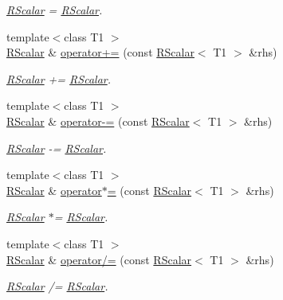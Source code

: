 \begin{DoxyCompactItemize}
\begin{DoxyCompactList}\small\item\em \mbox{\hyperlink{classENSEM_1_1RScalar}{R\+Scalar}} = \mbox{\hyperlink{classENSEM_1_1RScalar}{R\+Scalar}}. \end{DoxyCompactList}\item 
{\footnotesize template$<$class T1 $>$ }\\\mbox{\hyperlink{classENSEM_1_1RScalar}{R\+Scalar}} \& \mbox{\hyperlink{classENSEM_1_1RScalar_adc6bf2610b8af0ab175ef00d9194aa1d}{operator+=}} (const \mbox{\hyperlink{classENSEM_1_1RScalar}{R\+Scalar}}$<$ T1 $>$ \&rhs)
\begin{DoxyCompactList}\small\item\em \mbox{\hyperlink{classENSEM_1_1RScalar}{R\+Scalar}} += \mbox{\hyperlink{classENSEM_1_1RScalar}{R\+Scalar}}. \end{DoxyCompactList}\item 
{\footnotesize template$<$class T1 $>$ }\\\mbox{\hyperlink{classENSEM_1_1RScalar}{R\+Scalar}} \& \mbox{\hyperlink{classENSEM_1_1RScalar_a6d158db5ecf3dcc81fe905c6664cac58}{operator-\/=}} (const \mbox{\hyperlink{classENSEM_1_1RScalar}{R\+Scalar}}$<$ T1 $>$ \&rhs)
\begin{DoxyCompactList}\small\item\em \mbox{\hyperlink{classENSEM_1_1RScalar}{R\+Scalar}} -\/= \mbox{\hyperlink{classENSEM_1_1RScalar}{R\+Scalar}}. \end{DoxyCompactList}\item 
{\footnotesize template$<$class T1 $>$ }\\\mbox{\hyperlink{classENSEM_1_1RScalar}{R\+Scalar}} \& \mbox{\hyperlink{classENSEM_1_1RScalar_a4e8f4b8988a47a5e5eef56424d0e23d9}{operator$\ast$=}} (const \mbox{\hyperlink{classENSEM_1_1RScalar}{R\+Scalar}}$<$ T1 $>$ \&rhs)
\begin{DoxyCompactList}\small\item\em \mbox{\hyperlink{classENSEM_1_1RScalar}{R\+Scalar}} $\ast$= \mbox{\hyperlink{classENSEM_1_1RScalar}{R\+Scalar}}. \end{DoxyCompactList}\item 
{\footnotesize template$<$class T1 $>$ }\\\mbox{\hyperlink{classENSEM_1_1RScalar}{R\+Scalar}} \& \mbox{\hyperlink{classENSEM_1_1RScalar_a8d8cc49d7fed142b93c987c653465000}{operator/=}} (const \mbox{\hyperlink{classENSEM_1_1RScalar}{R\+Scalar}}$<$ T1 $>$ \&rhs)
\begin{DoxyCompactList}\small\item\em \mbox{\hyperlink{classENSEM_1_1RScalar}{R\+Scalar}} /= \mbox{\hyperlink{classENSEM_1_1RScalar}{R\+Scalar}}. \end{DoxyCompactList}\item 

\end{DoxyCompactItemize}
